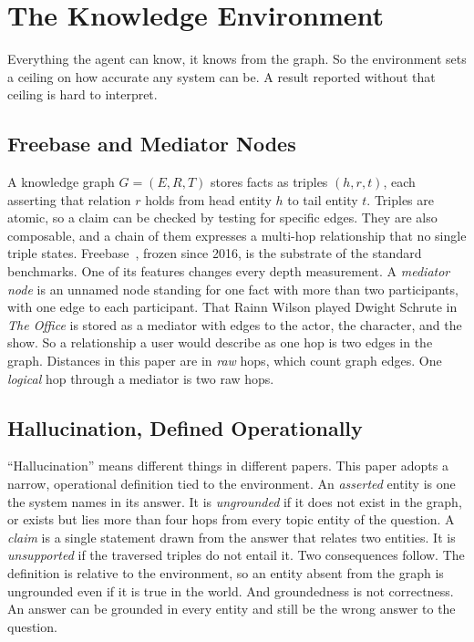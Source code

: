 %
\section{The Knowledge Environment}\label{sec:environment}

Everything the agent can know, it knows from the graph. So the environment sets
a ceiling on how accurate any system can be. A result reported without that
ceiling is hard to interpret.

\subsection{Freebase and Mediator Nodes}

A knowledge graph $G = (E, R, T)$ stores facts as triples $(h, r, t)$, each
asserting that relation $r$ holds from head entity $h$ to tail entity $t$.
Triples are atomic, so a claim can be checked by testing for specific edges.
They are also composable, and a chain of them expresses a multi-hop relationship
that no single triple states. Freebase~\cite{bollacker2008freebase}, frozen
since 2016, is the substrate of the standard benchmarks. One of its features
changes every depth measurement. A \emph{mediator node} is an unnamed node
standing for one fact with more than two participants, with one edge to each
participant. That Rainn Wilson played Dwight Schrute in \emph{The Office} is
stored as a mediator with edges to the actor, the character, and the show. So a
relationship a user would describe as one hop is two edges in the graph.
Distances in this paper are in \emph{raw} hops, which count graph edges. One
\emph{logical} hop through a mediator is two raw hops.

\subsection{Hallucination, Defined Operationally}\label{sec:halluc}

``Hallucination'' means different things in different papers. This paper adopts
a narrow, operational definition tied to the environment. An \emph{asserted}
entity is one the system names in its answer. It is \emph{ungrounded} if it does
not exist in the graph, or exists but lies more than four hops from every topic
entity of the question. A \emph{claim} is a single statement drawn from the
answer that relates two entities. It is \emph{unsupported} if the traversed
triples do not entail it. Two consequences follow. The definition is relative to
the environment, so an entity absent from the graph is ungrounded even if it is
true in the world. And groundedness is not correctness. An answer can be
grounded in every entity and still be the wrong answer to the question.

